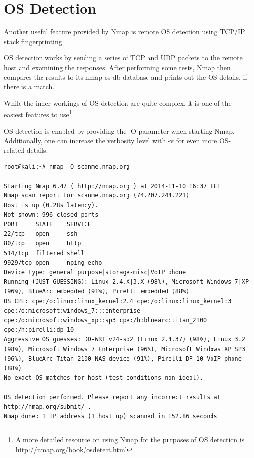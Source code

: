 \documentclass[a4paper,oneside,12pt]{book}
\begin{document}
\chapter*{OS Detection}
 

Another useful feature provided by Nmap is remote OS detection using TCP/IP stack fingerprinting.

OS detection works by sending a series of TCP and UDP packets to the remote host and examining the responses. After performing some tests, Nmap then compares the results to its nmap-os-db database and prints out the OS details, if there is a match.

While the inner workings of OS detection are quite complex, it is one of the easiest features to use\footnote{A more detailed resource on using Nmap for the purposes of OS detection is \url{http://nmap.org/book/osdetect.html}
}.

OS detection is enabled by providing the -O parameter when starting Nmap. Additionally, one can increase the verbosity level with -v for even more OS-related details.

\begin{lstlisting}[title=A sample Nmap scan using the OS detection option]
root@kali:~# nmap -O scanme.nmap.org

Starting Nmap 6.47 ( http://nmap.org ) at 2014-11-10 16:37 EET
Nmap scan report for scanme.nmap.org (74.207.244.221)
Host is up (0.28s latency).
Not shown: 996 closed ports
PORT     STATE    SERVICE
22/tcp   open     ssh
80/tcp   open     http
514/tcp  filtered shell
9929/tcp open     nping-echo
Device type: general purpose|storage-misc|VoIP phone
Running (JUST GUESSING): Linux 2.4.X|3.X (98%), Microsoft Windows 7|XP (96%), BlueArc embedded (91%), Pirelli embedded (88%)
OS CPE: cpe:/o:linux:linux_kernel:2.4 cpe:/o:linux:linux_kernel:3 cpe:/o:microsoft:windows_7:::enterprise cpe:/o:microsoft:windows_xp::sp3 cpe:/h:bluearc:titan_2100 cpe:/h:pirelli:dp-10
Aggressive OS guesses: DD-WRT v24-sp2 (Linux 2.4.37) (98%), Linux 3.2 (98%), Microsoft Windows 7 Enterprise (96%), Microsoft Windows XP SP3 (96%), BlueArc Titan 2100 NAS device (91%), Pirelli DP-10 VoIP phone (88%)
No exact OS matches for host (test conditions non-ideal).

OS detection performed. Please report any incorrect results at http://nmap.org/submit/ .
Nmap done: 1 IP address (1 host up) scanned in 152.86 seconds
\end{lstlisting}
\end{document}
